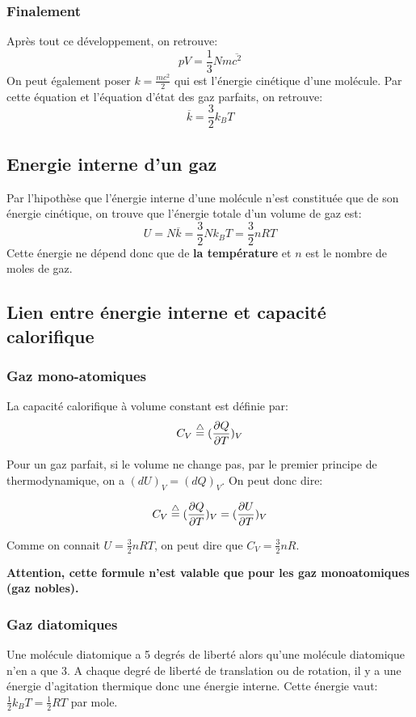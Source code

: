 \subsubsection{Finalement}
Après tout ce développement, on retrouve:
$$pV = \frac{1}{3}Nm\overline{c^2}$$
On peut également poser $k = \frac{mc^2}{2}$ qui est l'énergie cinétique d'une molécule.
Par cette équation et l'équation d'état des gaz parfaits, on retrouve:
$$\overline{k} = \frac{3}{2}k_B T$$

\subsection{Energie interne d'un gaz}
Par l'hipothèse que l'énergie interne d'une molécule n'est constituée que de son énergie cinétique, on trouve que l'énergie totale d'un volume de gaz est:
$$U = N\overline{k} = \frac{3}{2}Nk_BT = \frac{3}{2}nRT$$
Cette énergie ne dépend donc que de {\bf la température} et $n$ est le nombre de moles de gaz.

\subsection{Lien entre énergie interne et capacité calorifique}
\subsubsection{Gaz mono-atomiques}
La capacité calorifique à volume constant est définie par: 
$$C_V \buildrel\triangle\over = (\frac{\partial Q}{\partial T})_V$$

Pour un gaz parfait, si le volume ne change pas, par le premier principe de thermodynamique, on a $(dU)_V = (dQ)_V$. On peut donc dire:

$$C_V \buildrel\triangle\over = (\frac{\partial Q}{\partial T})_V = (\frac{\partial U}{\partial T})_V$$

Comme on connait $U = \frac{3}{2}nRT$, on peut dire que $C_V = \frac{3}{2}nR$.

{\bf Attention, cette formule n'est valable que pour les gaz monoatomiques (gaz nobles).}

\subsubsection{Gaz diatomiques}
Une molécule diatomique a 5 degrés de liberté alors qu'une molécule diatomique n'en a que 3.
A chaque degré de liberté de translation ou de rotation, il y a une énergie d'agitation thermique donc une énergie interne. Cette énergie vaut: $\frac{1}{2}k_BT = \frac{1}{2}RT$ par mole.

